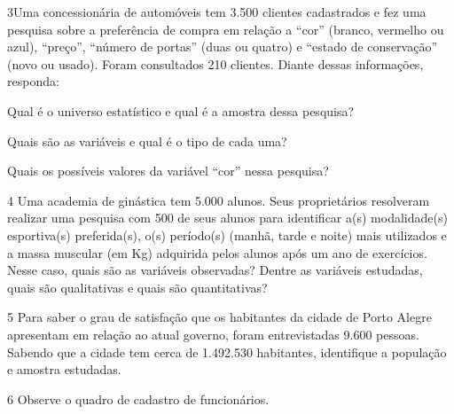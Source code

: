 \num{3}Uma concessionária de automóveis tem 3.500 clientes cadastrados e
fez uma pesquisa sobre a preferência de compra em relação a “cor”
(branco, vermelho ou azul), “preço”, “número de portas” (duas ou
quatro) e “estado de conservação” (novo ou usado). Foram consultados
210 clientes. Diante dessas informações, responda:

\begin{escolha}
\item
  Qual é o universo estatístico e qual é a amostra dessa pesquisa?


\item
  Quais são as variáveis e qual é o tipo de cada uma?


\item
  Quais os possíveis valores da variável “cor” nessa pesquisa?

\end{escolha}

\num{4} Uma academia de ginástica tem 5.000 alunos. Seus proprietários
resolveram realizar uma pesquisa com 500 de seus alunos para identificar
a(s) modalidade(s) esportiva(s) preferida(s), o(s) período(s) (manhã,
tarde e noite) mais utilizados e a massa muscular (em Kg) adquirida
pelos alunos após um ano de exercícios. Nesse caso, quais são as
variáveis observadas? Dentre as variáveis estudadas, quais são
qualitativas e quais são quantitativas?


\num{5} Para saber o grau de satisfação que os habitantes da cidade
de Porto Alegre apresentam em relação ao atual governo, foram
entrevistadas 9.600 pessoas. Sabendo que a cidade tem cerca de 1.492.530
habitantes, identifique a população e amostra estudadas.



\pagebreak
\num{6} Observe o quadro de cadastro de
funcionários.

